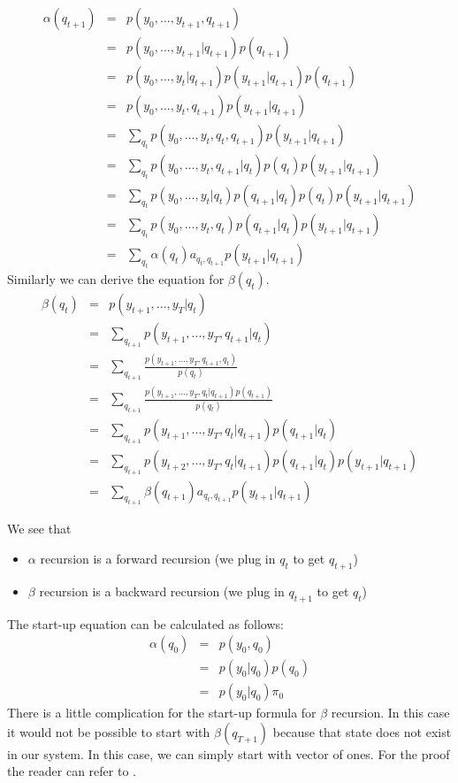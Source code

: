 \begin{eqnarray*}
\alpha(q_{t+1}) &=& p(y_0,...,y_{t+1},q_{t+1}) \\
 &=& p(y_0,...,y_{t+1}|q_{t+1})p(q_{t+1})\\
 &=& p(y_0,...,y_t|q_{t+1})p(y_{t+1}|q_{t+1})p(q_{t+1})\\
 &=& p(y_0,...,y_t,q_{t+1})p(y_{t+1}|q_{t+1})\\
 &=& \sum_{q_t}p(y_0,...,y_t,q_t,q_{t+1})p(y_{t+1}|q_{t+1})\\
 &=& \sum_{q_t}p(y_0,...,y_t,q_{t+1}|q_t)p(q_t)p(y_{t+1}|q_{t+1})\\
 &=& \sum_{q_t}p(y_0,...,y_t|q_t)p(q_{t+1}|q_t)p(q_t)p(y_{t+1}|q_{t+1})\\
 &=& \sum_{q_t}p(y_0,...,y_t,q_t)p(q_{t+1}|q_t)p(y_{t+1}|q_{t+1})\\
 &=& \sum_{q_t}\alpha(q_t)a_{q_t,q_{t+1}}p(y_{t+1}|q_{t+1})
\end{eqnarray*}
Similarly we can derive the equation for $\beta(q_t)$.
\begin{eqnarray*}
\beta(q_t) &=& p(y_{t+1},...,y_T|q_t) \\
&=& \sum_{q_{t+1}} p(y_{t+1},...,y_T,q_{t+1}|q_t) \\
&=& \sum_{q_{t+1}} \frac{p(y_{t+1},...,y_T,q_{t+1},q_t)}{p(q_t)}\\
&=& \sum_{q_{t+1}} \frac{p(y_{t+1},...,y_T,q_t|q_{t+1})p(q_{t+1})}{p(q_t)}\\
&=& \sum_{q_{t+1}} p(y_{t+1},...,y_T,q_t|q_{t+1})p(q_{t+1}|q_t)\\
&=& \sum_{q_{t+1}} p(y_{t+2},...,y_T,q_t|q_{t+1})p(q_{t+1}|q_t)p(y_{t+1}|q_{t+1})\\
&=& \sum_{q_{t+1}} \beta(q_{t+1}) a_{q_t,q_{t+1}} p(y_{t+1}|q_{t+1})
\end{eqnarray*}

We see that
\begin{itemize}
   \item $\alpha$ recursion is a forward recursion (we plug in $q_t$ to get
     $q_{t+1}$)
   \item $\beta$ recursion is a backward recursion (we plug in $q_{t+1}$ to get
     $q_{t}$)
\end{itemize}
The start-up equation can be calculated as follows:
\begin{eqnarray*}
\alpha({q_0}) &=& p(y_0,q_0)\\
&=& p(y_0|q_0)p(q_0)\\
&=& p(y_0|q_0)\pi_0
\end{eqnarray*}
There is a little complication for the start-up formula for $\beta$
recursion. In this case it would not be possible to start with $\beta(q_{T+1})$
because that state does not exist in our system. In this case, we can simply
start with vector of ones. For the proof the reader can refer to \cite{jordan}. 

